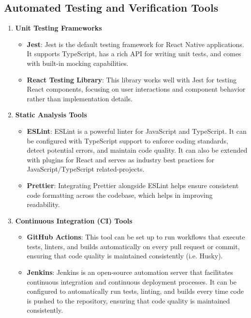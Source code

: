 \documentclass[12pt, titlepage]{article}
\begin{document}
\newpage

\subsection{Automated Testing and Verification Tools}

\begin{enumerate}
	\item \textbf{Unit Testing Frameworks}
	\begin{itemize}
		\item \textbf{Jest}: Jest is the default testing framework for React Native applications. It supports TypeScript, has a rich API for writing unit tests, and comes with built-in mocking capabilities.
		\item \textbf{React Testing Library}: This library works well with Jest for testing React components, focusing on user interactions and component behavior rather than implementation details.
	\end{itemize}
	\item \textbf{Static Analysis Tools}
	\begin{itemize}
		\item \textbf{ESLint}: ESLint is a powerful linter for JavaScript and TypeScript. It can be configured with TypeScript support to enforce coding standards, detect potential errors, and maintain code quality. It can also be extended with plugins for React and serves as industry best practices for JavaScript/TypeScript related-projects.
		\item \textbf{Prettier}: Integrating Prettier alongside ESLint helps ensure consistent code formatting across the codebase, which helps in improving readability.
	\end{itemize}
	\item \textbf{Continuous Integration (CI) Tools}
	\begin{itemize}
		\item \textbf{GitHub Actions}: This tool can be set up to run workflows that execute tests, linters, and builds automatically on every pull request or commit, ensuring that code quality is maintained consistently (i.e. Husky).
		\item \textbf{Jenkins}: Jenkins is an open-source automation server that facilitates continuous integration and continuous deployment processes. It can be configured to automatically run tests, linting, and builds every time code is pushed to the repository, ensuring that code quality is maintained consistently.
	\end{itemize}

\end{enumerate}
\end{document}
